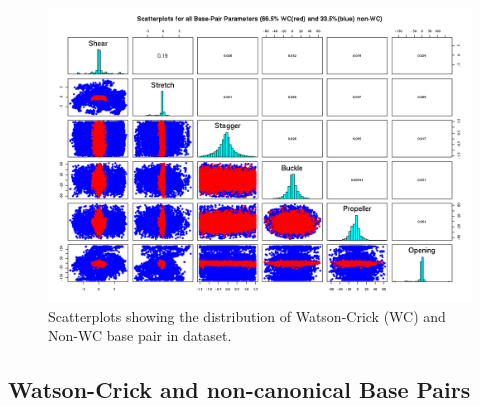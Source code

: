 \begin{figure}[H]
\centering
\includegraphics[scale=0.6, angle=90]{allscatter.png}
\caption{Scatterplots showing the distribution of Watson-Crick (WC)
  and Non-WC base pair in dataset.}
\label{fig:WCandnon}
\end{figure}


\subsection{Watson-Crick and non-canonical Base Pairs}

